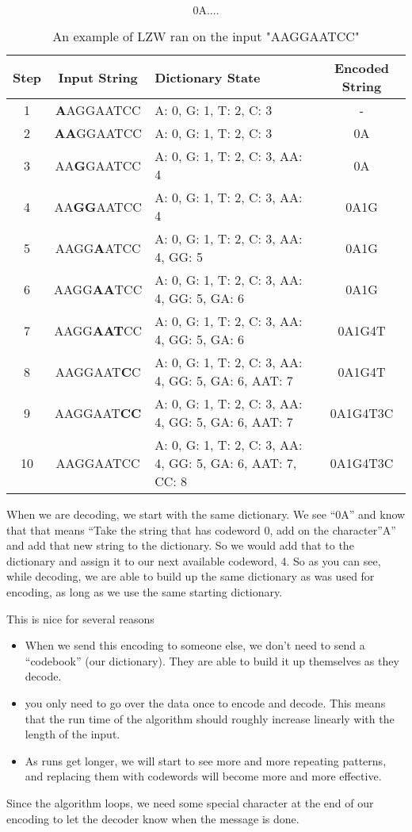 \documentclass[12pt,twoside]{reedthesis}
\providecommand{\tightlist}{%
  \setlength{\itemsep}{0pt}\setlength{\parskip}{0pt}}
\begin{document}
\[\text{0A....}\]
\begin{table}
\begin{tabular}{ | c | c | p{} | c | }
\hline
\textbf{Step} & \textbf{Input String} & \textbf{Dictionary State} & \textbf{Encoded String} \\
\hline
1 & \textbf{A}AGGAATCC & {A: 0, G: 1, T: 2, C: 3} & - \\
\hline
2 & \textbf{AA}GGAATCC & {A: 0, G: 1, T: 2, C: 3} & 0A \\
\hline
3 & AA\textbf{G}GAATCC & {A: 0, G: 1, T: 2, C: 3, AA: 4} & 0A  \\
\hline
4 & AA\textbf{GG}AATCC & {A: 0, G: 1, T: 2, C: 3, AA: 4} & 0A1G   \\
\hline
5 & AAGG\textbf{A}ATCC & {A: 0, G: 1, T: 2, C: 3, AA: 4, GG: 5} & 0A1G \\
\hline
6 & AAGG\textbf{AA}TCC & {A: 0, G: 1, T: 2, C: 3, AA: 4, GG: 5, GA: 6} & 0A1G  \\
\hline
7 & AAGG\textbf{AAT}CC & {A: 0, G: 1, T: 2, C: 3, AA: 4, GG: 5, GA: 6} & 0A1G4T  \\
\hline
8 & AAGGAAT\textbf{C}C & {A: 0, G: 1, T: 2, C: 3, AA: 4, GG: 5, GA: 6, AAT: 7} & 0A1G4T \\
\hline
9 & AAGGAAT\textbf{CC} & {A: 0, G: 1, T: 2, C: 3, AA: 4, GG: 5, GA: 6, AAT: 7} & 0A1G4T3C \\
\hline
10 & AAGGAATCC & {A: 0, G: 1, T: 2, C: 3, AA: 4, GG: 5, GA: 6, AAT: 7, CC: 8} & 0A1G4T3C \\
\hline
\end{tabular}
\caption{ An example of LZW ran on the input "AAGGAATCC"}
\end{table}
When we are decoding, we start with the same dictionary. We see ``0A'' and know that that means ``Take the string that has codeword 0, add on the character''A'' and add that new string to the dictionary. So we would add that to the dictionary and assign it to our next available codeword, 4. So as you can see, while decoding, we are able to build up the same dictionary as was used for encoding, as long as we use the same starting dictionary.

This is nice for several reasons
\begin{itemize}
\tightlist
\item
  When we send this encoding to someone else, we don't need to send a ``codebook'' (our dictionary). They are able to build it up themselves as they decode.
\item
  you only need to go over the data once to encode and decode. This means that the run time of the algorithm should roughly increase linearly with the length of the input.
\item
  As runs get longer, we will start to see more and more repeating patterns, and replacing them with codewords will become more and more effective.
\end{itemize}
Since the algorithm loops, we need some special character at the end of our encoding to let the decoder know when the message is done.
\end{document}
